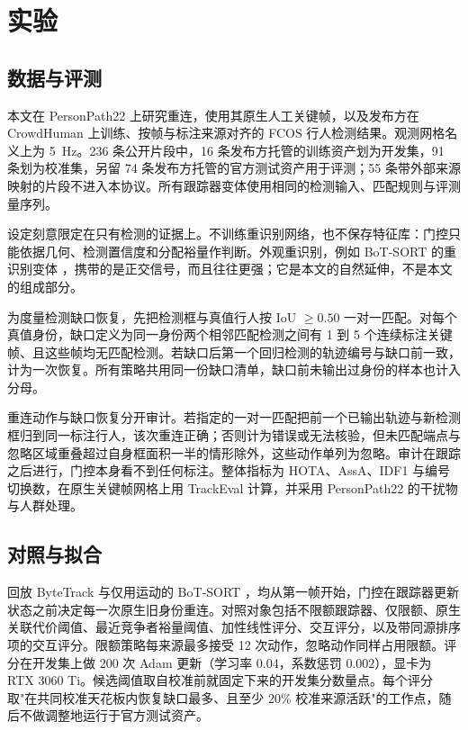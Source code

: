 \section{实验}

\subsection{数据与评测}
本文在 PersonPath22 \cite{shuai2022personpath22} 上研究重连，使用其原生人工关键帧，以及发布方在 CrowdHuman 上训练、按帧与标注来源对齐的 FCOS 行人检测结果。观测网格名义上为 5~Hz。236 条公开片段中，16 条发布方托管的训练资产划为开发集，91 条划为校准集，另留 74 条发布方托管的官方测试资产用于评测；55 条带外部来源映射的片段不进入本协议。所有跟踪器变体使用相同的检测输入、匹配规则与评测量序列。

设定刻意限定在只有检测的证据上。不训练重识别网络，也不保存特征库：门控只能依据几何、检测置信度和分配裕量作判断。外观重识别，例如 BoT-SORT 的重识别变体 \cite{aharon2022botsort}，携带的是正交信号，而且往往更强；它是本文的自然延伸，不是本文的组成部分。

为度量检测缺口恢复，先把检测框与真值行人按 IoU $\geq 0.50$ 一对一匹配。对每个真值身份，缺口定义为同一身份两个相邻匹配检测之间有 1 到 5 个连续标注关键帧、且这些帧均无匹配检测。若缺口后第一个回归检测的轨迹编号与缺口前一致，计为一次恢复。所有策略共用同一份缺口清单，缺口前未输出过身份的样本也计入分母。

重连动作与缺口恢复分开审计。若指定的一对一匹配把前一个已输出轨迹与新检测框归到同一标注行人，该次重连正确；否则计为错误或无法核验，但未匹配端点与忽略区域重叠超过自身框面积一半的情形除外，这些动作单列为忽略。审计在跟踪之后进行，门控本身看不到任何标注。整体指标为 HOTA、AssA、IDF1 与编号切换数，在原生关键帧网格上用 TrackEval \cite{luiten2021hota} 计算，并采用 PersonPath22 的干扰物与人群处理。

\subsection{对照与拟合}
回放 ByteTrack \cite{zhang2022bytetrack} 与仅用运动的 BoT-SORT \cite{aharon2022botsort}，均从第一帧开始，门控在跟踪器更新状态之前决定每一次原生旧身份重连。对照对象包括不限额跟踪器、仅限额、原生关联代价阈值、最近竞争者裕量阈值、加性线性评分、交互评分，以及带同源排序项的交互评分。限额策略每来源最多接受 12 次动作，忽略动作同样占用限额。评分在开发集上做 200 次 Adam 更新（学习率 0.04，系数惩罚 0.002），显卡为 RTX 3060 Ti。候选阈值取自校准前就固定下来的开发集分数量点。每个评分取"在共同校准天花板内恢复缺口最多、且至少 20\% 校准来源活跃"的工作点，随后不做调整地运行于官方测试资产。

